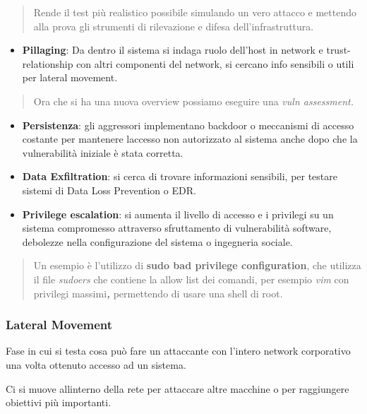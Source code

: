 \begin{quote}
Rende il test più realistico possibile simulando un vero attacco e
mettendo alla prova gli strumenti di rilevazione e difesa
dell'infrastruttura.
\end{quote}

\begin{itemize}
\item
  \textbf{Pillaging}: Da dentro il sistema si indaga ruolo dell'host in
  network e trust-relationship con altri componenti del network, si
  cercano info sensibili o utili per lateral movement.
\end{itemize}

\begin{quote}
Ora che si ha una nuova overview possiamo eseguire una \emph{vuln
assessment.}
\end{quote}

\begin{itemize}
\item
  \textbf{Persistenza}: gli aggressori implementano backdoor o
  meccanismi di accesso costante per mantenere l\textquotesingle accesso
  non autorizzato al sistema anche dopo che la vulnerabilità iniziale è
  stata corretta.
\item
  \textbf{Data Exfiltration}: si cerca di trovare informazioni
  sensibili, per testare sistemi di Data Loss Prevention o EDR.
\item
  \textbf{Privilege escalation}: si aumenta il livello di accesso e i
  privilegi su un sistema compromesso attraverso sfruttamento di
  vulnerabilità software, debolezze nella configurazione del sistema o
  ingegneria sociale.
\end{itemize}

\begin{quote}
Un esempio è l'utilizzo di \textbf{sudo bad privilege configuration},
che utilizza il file \emph{sudoers} che contiene la allow list dei
comandi, per esempio \emph{vim} con privilegi massimi\emph{\textbf{,}}
permettendo di usare una shell di root.
\end{quote}

\subsubsection{Lateral Movement}\label{lateral-movement}

Fase in cui si testa cosa può fare un attaccante con l'intero network
corporativo una volta ottenuto accesso ad un sistema.

Ci si muove all\textquotesingle interno della rete per attaccare altre
macchine o per raggiungere obiettivi più importanti.

